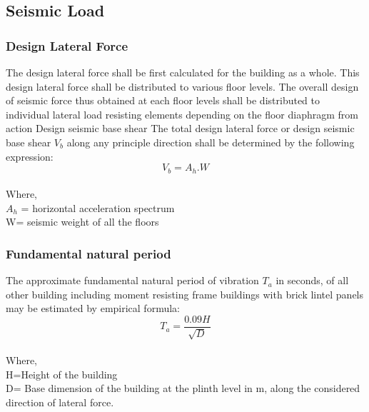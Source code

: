 \subsection{Seismic Load}
\subsubsection{\textbf{Design Lateral Force}}
The design lateral force shall be first calculated for the building as a whole. This design lateral force shall be distributed to various floor levels. The overall design of seismic force thus obtained at each floor levels shall be distributed to individual lateral load resisting elements depending on the floor diaphragm from action
Design seismic base shear
The total design lateral force or design seismic base shear $V_{b}$ along any principle direction shall be determined by the following expression:\\
\begin{equation}{V}_b ={A}_h.W
\end{equation}\\
Where, \\
${A}_h$ = horizontal acceleration spectrum\\
W= seismic weight of all the floors\\

\subsubsection{\textbf{Fundamental natural period}}

The approximate fundamental natural period of vibration $T_{a}$ in seconds, of all other building including moment resisting frame buildings with brick lintel panels may be estimated by empirical formula: \\
\begin{equation}
T_{a}=\frac{0.09H}{\sqrt{D}}
\end{equation}\\
Where,\\
H=Height of the building\\ 
D= Base dimension of the building at the plinth level in m, along the considered direction of lateral force.\\

